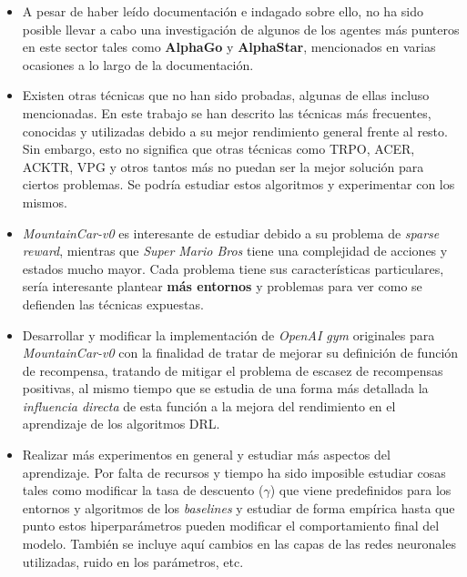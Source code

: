 \documentclass[11pt,fleqn]{book} %
\begin{document}
\begin{itemize}
	\item A pesar de haber leído documentación e indagado sobre ello, no ha sido posible llevar a cabo una investigación de algunos de los agentes más punteros en este sector tales como \textbf{AlphaGo} y \textbf{AlphaStar}, mencionados en varias ocasiones a lo largo de la documentación. \\
	
	\item Existen otras técnicas que no han sido probadas, algunas de ellas incluso mencionadas. En este trabajo se han descrito las técnicas más frecuentes, conocidas y utilizadas debido a su mejor rendimiento general frente al resto. Sin embargo, esto no significa que otras técnicas como TRPO, ACER, ACKTR, VPG y otros tantos más no puedan ser la mejor solución para ciertos problemas. Se podría estudiar estos algoritmos y experimentar con los mismos. \\
	
	\item \textit{MountainCar-v0} es interesante de estudiar debido a su problema de \textit{sparse reward}, mientras que \textit{Super Mario Bros} tiene una complejidad de acciones y estados mucho mayor. Cada problema tiene sus características particulares, sería interesante plantear \textbf{más entornos} y problemas para ver como se defienden las técnicas expuestas. \\
	
	\item Desarrollar y modificar la implementación de \textit{OpenAI gym} originales para \textit{MountainCar-v0} con la finalidad de tratar de mejorar su definición de función de recompensa, tratando de mitigar el problema de escasez de recompensas positivas, al mismo tiempo que se estudia de una forma más detallada la \textit{influencia directa} de esta función a la mejora del rendimiento en el aprendizaje de los algoritmos DRL. \\
	
	\item Realizar más experimentos en general y estudiar más aspectos del aprendizaje. Por falta de recursos y tiempo ha sido imposible estudiar cosas tales como modificar la tasa de descuento ($\gamma$) que viene predefinidos para los entornos y algoritmos de los \textit{baselines} y estudiar de forma empírica hasta que punto estos hiperparámetros pueden modificar el comportamiento final del modelo. También se incluye aquí cambios en las capas de las redes neuronales utilizadas, ruido en los parámetros, etc.
	
\end{itemize}
\end{document}
